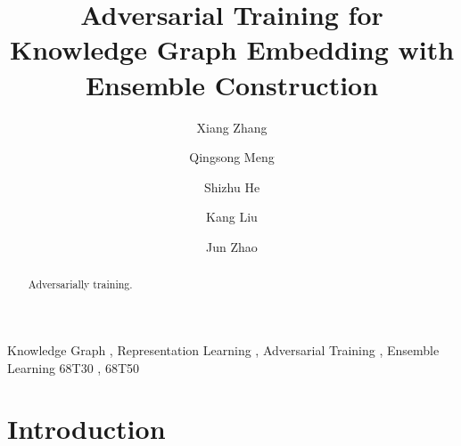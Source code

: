\documentclass[twocolumn,a4paper,10pt,preprint,3p]{elsarticle}
\begin{document}

\begin{frontmatter}

\title{Adversarial Training for Knowledge Graph Embedding with Ensemble Construction}


\author[hrbaddress]{Xiang Zhang}

\author[hrbaddress]{Qingsong Meng}

\author[ucasaddress]{Shizhu He}

\author[ucasaddress]{Kang Liu}

\author[ucasaddress]{Jun Zhao}

\address[hrbaddress]{Harbin University of Science and Technology, No.52 Xuefu Road, Nangang District, Harbin, 150080, China}
\address[ucasaddress]{University of Chinese Academy of Sciences, No.19(A) Yuquan Road, Shijingshan District, Beijing, 100049, China}


\begin{abstract}
Adversarially training.
\end{abstract}

\begin{keyword}
Knowledge Graph \sep{} Representation Learning \sep{} Adversarial Training \sep{} Ensemble Learning
\MSC[2010] 68T30 \sep{} 68T50
\end{keyword}

\end{frontmatter}


\linenumbers{}


\section{Introduction}
\label{sec:intro}
\end{document}
